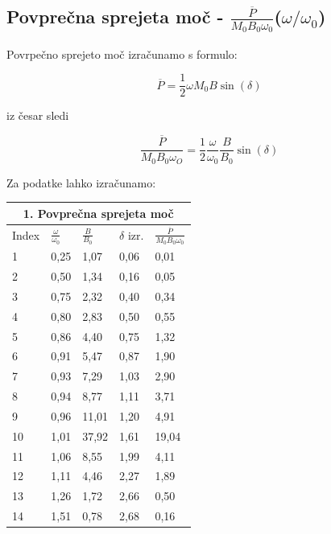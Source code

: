 \subsection{Povprečna sprejeta moč - $\frac{\overline{P}}{M_0 B_0 \omega_0}$($\omega/\omega_0$)}

Povrpečno sprejeto moč izračunamo s formulo:

\centering \Large
\begin{equation}
    \overline{P} = \frac{1}{2}\omega M_0 B \sin{(\delta)}
\end{equation}
\raggedright \normalsize

iz česar sledi

\centering \Large
\begin{equation}
    \frac{\overline{P}}{M_0B_0\omega_O} = \frac{1}{2} \frac{\omega}{\omega_0} \frac{B}{B_0} \sin(\delta)
\end{equation}
\raggedright \normalsize

Za podatke lahko izračunamo:

\centering \large
\begin{tabular}{|p{1.5cm}|p{1.5cm}|p{1.5cm}|p{1.5cm}|p{1.5cm}|}
    \hline
    \multicolumn{5}{|c|}{1. Povprečna sprejeta moč}\\
    \hline
    Index & $\frac{\omega}{\omega_0}$ & $\frac{B}{B_0}$ & $\delta$ izr. & $\frac{\overline{P}}{M_0 B_0 \omega_0}$\\ 
    \hline
    1 & 0,25 & 1,07 & 0,06 & 0,01\\
    2 & 0,50 & 1,34 & 0,16 & 0,05\\
    3 & 0,75 & 2,32 & 0,40 & 0,34\\
    4 & 0,80 & 2,83 & 0,50 & 0,55\\
    5 & 0,86 & 4,40 & 0,75 & 1,32\\
    6 & 0,91 & 5,47 & 0,87 & 1,90\\
    7 & 0,93 & 7,29 & 1,03 & 2,90\\
    8 & 0,94 & 8,77 & 1,11 & 3,71\\
    9 & 0,96 & 11,01 & 1,20 & 4,91\\
    10 & 1,01 & 37,92 & 1,61 & 19,04\\
    11 & 1,06 & 8,55 & 1,99 & 4,11\\
    12 & 1,11 & 4,46 & 2,27 & 1,89\\
    13 & 1,26 & 1,72 & 2,66 & 0,50\\
    14 & 1,51 & 0,78 & 2,68 & 0,16\\
    \hline
\end{tabular}

